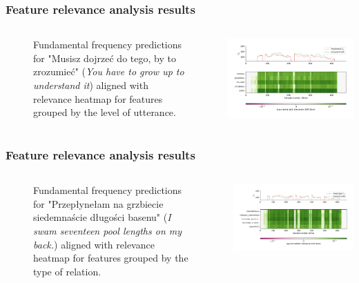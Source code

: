\documentclass[a4paper,9pt]{beamer}
\theoremstyle{mytheoremstyle}
\begin{document}
\begin{frame}
\frametitle{Feature relevance analysis results}
\begin{columns}
\begin{figure}
	\caption{Fundamental frequency predictions for "Musisz dojrze\'c do tego, by to zrozumie\'c" (\textit{You have to grow up to understand it}) aligned with relevance heatmap for features grouped by the level of utterance.}
\end{figure}
\begin{center}
  \includegraphics[width=\textwidth]{res/linguistic_levels_amu_pl_ilo_baza_2006e_e1014}
\end{center}
\end{columns}
\end{frame}

\begin{frame}
\frametitle{Feature relevance analysis results}
\begin{columns}
\begin{figure}
	\caption{Fundamental frequency predictions for "Przep\l{}yne\l{}am na grzbiecie siedemna\'scie d\l{}ugo\'sci basenu" (\textit{I swam seventeen pool lengths on my back.}) aligned with relevance heatmap for features grouped by the type of relation.}
\end{figure}
\begin{center}
  \includegraphics[width=\textwidth]{res/relation_types_amu_pl_ilo_baza_2006a_zbitki_a0135}
\end{center}
\end{columns}
\end{frame}
\end{document}
